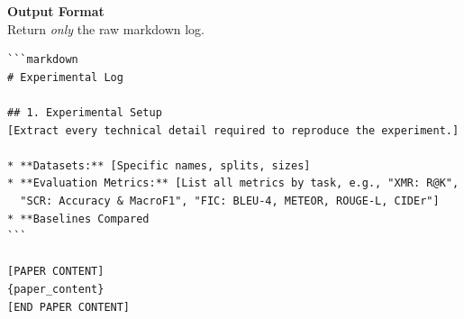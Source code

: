 \vspace{1em}
\noindent\textbf{Output Format}\\
\vspace{0.5em}
Return \textit{only} the raw markdown log.

\begin{verbatim}
```markdown
# Experimental Log

## 1. Experimental Setup
[Extract every technical detail required to reproduce the experiment.]

* **Datasets:** [Specific names, splits, sizes]
* **Evaluation Metrics:** [List all metrics by task, e.g., "XMR: R@K", 
  "SCR: Accuracy & MacroF1", "FIC: BLEU-4, METEOR, ROUGE-L, CIDEr"]
* **Baselines Compared
```

[PAPER CONTENT]
{paper_content}
[END PAPER CONTENT]
\end{verbatim}